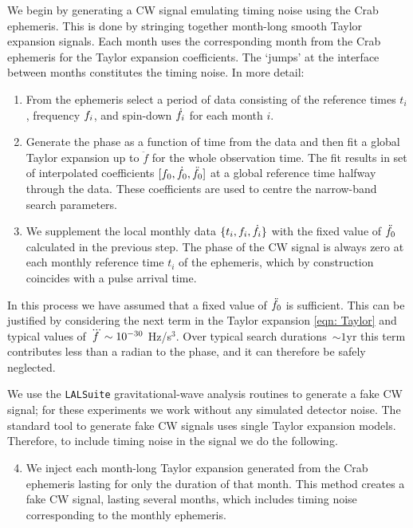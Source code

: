 \documentclass[../full_thesis/full_thesis.tex]{subfiles}
\begin{document}
We begin by generating a CW signal emulating timing noise using the Crab
ephemeris. This is done by stringing together month-long smooth Taylor expansion
signals. Each month uses the corresponding month from the Crab
ephemeris for the Taylor expansion coefficients. The `jumps' at the interface
between months constitutes the timing noise.
In more detail:
\begin{enumerate}

\item From the ephemeris select a period of data consisting of the reference
times $t_i$, frequency $f_i$, and spin-down
$\dot{f}_i$ for each month $i$.

\item \label{fit} Generate the phase as a function of time from the data and
then fit a global Taylor expansion up to $\ddot{f}$ for the whole
observation time.  The fit results in set of interpolated coefficients
$[f_{0}, \dot{f}_{0}, \ddot{f}_{0}]$ at a global reference time halfway through
the data. These coefficients are used to centre the narrow-band search
parameters.

\item We supplement the local monthly data $\{t_i, f_{i}, \dot{f}_{i}\}$ with
the fixed value of $\ddot{f}_{0}$ calculated in the previous step. The phase of
the CW signal is always zero at each monthly reference time $t_i$ of the
ephemeris, which by construction coincides with a pulse arrival time.

\end{enumerate}

In this process we have assumed that a fixed value of $\ddot{f}_{0}$ is
sufficient. This can be justified by considering the next term in the Taylor
expansion \eqref{eqn: Taylor} and typical values of $\dddot{f} \sim 10^{-30}$
Hz/s$^{3}$.  Over typical search durations~$\sim 1$yr this term contributes
less than a radian to the phase, and it can therefore be safely neglected.

We use the \verb+LALSuite+ \cite{lalsuite} gravitational-wave analysis routines
to generate a fake CW signal; for these experiments we work
without any simulated detector noise. The standard tool to generate fake CW
signals uses single Taylor expansion models. Therefore, to include timing noise
in the signal we do the following.

\begin{enumerate}
\setcounter{enumi}{3}

\item We inject each month-long Taylor expansion generated from the Crab ephemeris
lasting for only the duration of that month.
This
method creates a fake CW signal, lasting several months, which includes timing noise corresponding to the monthly
ephemeris.

\end{enumerate} 
\end{document}
